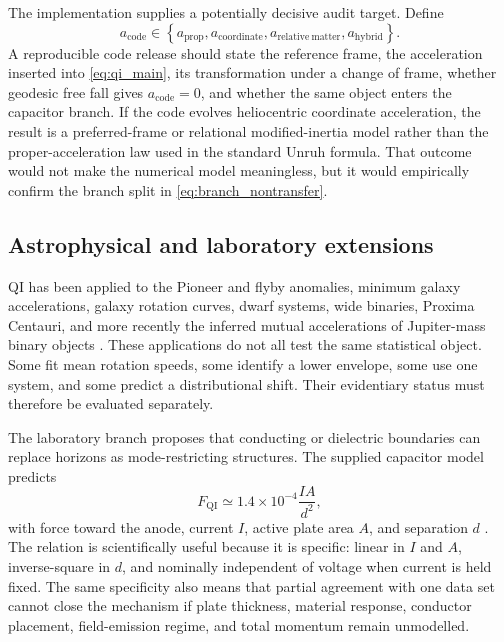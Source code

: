 \documentclass[11pt]{article}
\newcommand{\QI}{\mathrm{QI}}
\begin{document}
The implementation supplies a potentially decisive audit target. Define
\begin{equation}
 a_{\mathrm{code}}
 \in
 \left\{
 a_{\mathrm{prop}},
 a_{\mathrm{coordinate}},
 a_{\mathrm{relative\ matter}},
 a_{\mathrm{hybrid}}
 \right\}.
 \label{eq:code_acceleration_classes}
\end{equation}
A reproducible code release should state the reference frame, the acceleration inserted into \cref{eq:qi_main}, its transformation under a change of frame, whether geodesic free fall gives \(a_{\mathrm{code}}=0\), and whether the same object enters the capacitor branch. If the code evolves heliocentric coordinate acceleration, the result is a preferred-frame or relational modified-inertia model rather than the proper-acceleration law used in the standard Unruh formula. That outcome would not make the numerical model meaningless, but it would empirically confirm the branch split in \cref{eq:branch_nontransfer}.

\subsection{Astrophysical and laboratory extensions}

QI has been applied to the Pioneer and flyby anomalies, minimum galaxy accelerations, galaxy rotation curves, dwarf systems, wide binaries, Proxima Centauri, and more recently the inferred mutual accelerations of Jupiter-mass binary objects \cite{McCulloch2007,McCulloch2010,McCulloch2012,McCulloch2017Galaxy,McCullochLucio2019,McCulloch2024Proxima,McCulloch2026JuMBO}. These applications do not all test the same statistical object. Some fit mean rotation speeds, some identify a lower envelope, some use one system, and some predict a distributional shift. Their evidentiary status must therefore be evaluated separately.

The laboratory branch proposes that conducting or dielectric boundaries can replace horizons as mode-restricting structures. The supplied capacitor model predicts
\begin{equation}
    F_{\QI}
    \simeq
    1.4\times10^{-4}\frac{IA}{d^{2}},
    \label{eq:capacitor_force}
\end{equation}
with force toward the anode, current \(I\), active plate area \(A\), and separation \(d\) \cite{McCulloch2021Capacitors}. The relation is scientifically useful because it is specific: linear in \(I\) and \(A\), inverse-square in \(d\), and nominally independent of voltage when current is held fixed. The same specificity also means that partial agreement with one data set cannot close the mechanism if plate thickness, material response, conductor placement, field-emission regime, and total momentum remain unmodelled.
\end{document}
